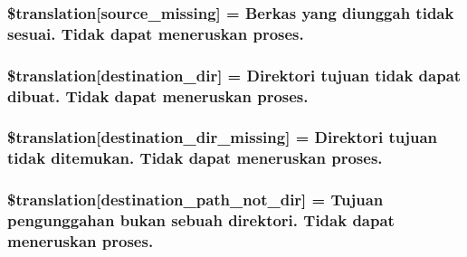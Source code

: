 \subsubsection[{\$translation}]{\setlength{\rightskip}{0pt plus 5cm}\$translation\mbox{[}\textquotesingle{}source\+\_\+missing\textquotesingle{}\mbox{]} = \textquotesingle{}Berkas yang diunggah tidak sesuai. Tidak dapat meneruskan proses.\textquotesingle{}}\label{class_8upload_8id___i_d_8php_aceaaf7355acaaf10f0ae60378d03c468}
\hypertarget{class_8upload_8id___i_d_8php_aff2427c72a2598aefa6d58df1dd18b08}{}
\subsubsection[{\$translation}]{\setlength{\rightskip}{0pt plus 5cm}\$translation\mbox{[}\textquotesingle{}destination\+\_\+dir\textquotesingle{}\mbox{]} = \textquotesingle{}Direktori tujuan tidak dapat dibuat. Tidak dapat meneruskan proses.\textquotesingle{}}\label{class_8upload_8id___i_d_8php_aff2427c72a2598aefa6d58df1dd18b08}
\hypertarget{class_8upload_8id___i_d_8php_a9ef28d3cf09942c6c0a1e77fa09185e8}{}
\subsubsection[{\$translation}]{\setlength{\rightskip}{0pt plus 5cm}\$translation\mbox{[}\textquotesingle{}destination\+\_\+dir\+\_\+missing\textquotesingle{}\mbox{]} = \textquotesingle{}Direktori tujuan tidak ditemukan. Tidak dapat meneruskan proses.\textquotesingle{}}\label{class_8upload_8id___i_d_8php_a9ef28d3cf09942c6c0a1e77fa09185e8}
\hypertarget{class_8upload_8id___i_d_8php_a5704a67137126e8c87b7a364175929d4}{}
\subsubsection[{\$translation}]{\setlength{\rightskip}{0pt plus 5cm}\$translation\mbox{[}\textquotesingle{}destination\+\_\+path\+\_\+not\+\_\+dir\textquotesingle{}\mbox{]} = \textquotesingle{}Tujuan pengunggahan bukan sebuah direktori. Tidak dapat meneruskan proses.\textquotesingle{}}\label{class_8upload_8id___i_d_8php_a5704a67137126e8c87b7a364175929d4}
\hypertarget{class_8upload_8id___i_d_8php_a97608ea194a616db49141a0e6dee900c}{}
